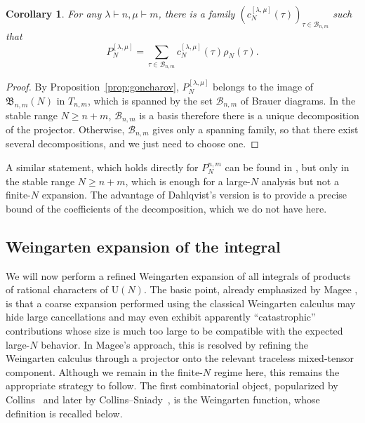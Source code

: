 \documentclass[11pt,a4paper,reqno]{article}
\newtheorem{corollary}[theorem]{Corollary}
\theoremstyle{definition}
\theoremstyle{remark}
\newcommand\U{{\mathrm U}}
\newcommand\B{{\mathcal{B}}}
\newcommand\Br{{\mathfrak{B}}}
\begin{document}
\begin{corollary}\label{cor:PN-nm}
For any $\lambda\vdash n,\mu\vdash m$, there is a family $(c_N^{[\lambda,\mu]}(\tau))_{\tau\in\B_{n,m}}$ such that
\begin{equation}\label{eq:PN-nm}
P_N^{[\lambda,\mu]}=\sum_{\tau\in\B_{n,m}} c_N^{[\lambda,\mu]}(\tau)\rho_N(\tau).
\end{equation}
\end{corollary}

\begin{proof}
By Proposition~\ref{prop:goncharov}, $P_N^{[\lambda,\mu]}$ belongs to the image of $\Br_{n,m}(N)$ in $T_{n,m}$, which is spanned by the set $\B_{n,m}$ of Brauer diagrams. In the stable range $N\geq n+m$, $\B_{n,m}$ is a basis therefore there is a unique decomposition of the projector. Otherwise, $\B_{n,m}$ gives only a spanning family, so that there exist several decompositions, and we just need to choose one.
\end{proof}

A similar statement, which holds directly for $P_N^{n,m}$ can be found in \cite[Lemma 4.1]{Dah26}, but only in the stable range $N\geq n+m$, which is enough for a large-$N$ analysis but not a finite-$N$ expansion. The advantage of Dahlqvist's version is to provide a precise bound of the coefficients of the decomposition, which we do not have here.

\subsection{Weingarten expansion of the integral}

We will now perform a refined Weingarten expansion of all integrals of products of rational characters of $\U(N)$. The basic point, already emphasized by Magee \cite{Mag2}, is that a coarse expansion performed using the classical Weingarten calculus may hide large cancellations and may even exhibit apparently ``catastrophic'' contributions whose size is much too large to be compatible with the expected large-$N$ behavior. In Magee's approach, this is resolved by refining the Weingarten calculus through a projector onto the relevant traceless mixed-tensor component. Although we remain in the finite-$N$ regime here, this remains the appropriate strategy to follow. The first combinatorial object, popularized by Collins~\cite{Col03} and later by Collins--Sniady~\cite{ColSni06}, is the Weingarten function, whose definition is recalled below.
\end{document}

